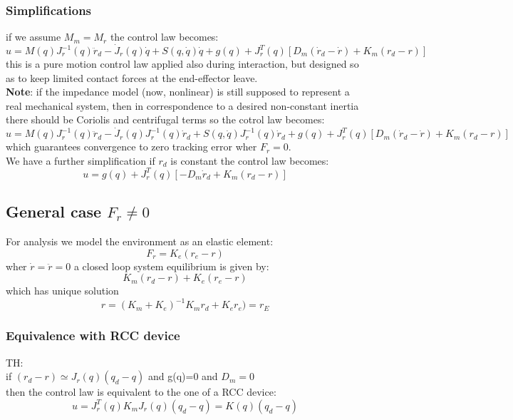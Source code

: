 \documentclass[a4paper,12pt]{article}
\begin{document}
\subsubsection{Simplifications}
if we assume $M_m = M_r$ the control law becomes:
\begin{equation}
u=M(q)J_r^{-1}(q){\ddot{r}_d-\dot{J}_r(q)\dot{q}}+S(q,\dot{q})\dot{q}+g(q)+J_r^T(q)[
    D_m(\dot{r}_d-\dot{r})+K_m(r_d-r)]
\end{equation}
this is a pure motion control law applied also during interaction,
but designed so as to keep limited contact forces
 at the end-effector leave.\\
\textbf{Note}:  if the impedance model (now, nonlinear) is still supposed to
represent a real mechanical system, then in correspondence to a desired
non-constant inertia there should be Coriolis and centrifugal terms so
the cotrol law becomes: \begin{equation}
u=M(q)J_r^{-1}(q){\ddot{r}_d-\dot{J}_r(q)J_r^{-1}(q)\dot{r}_d}+
S(q,\dot{q})J_r^{-1}(q)\dot{r}_d+g(q)+J_r^T(q)[
    D_m(\dot{r}_d-\dot{r})+K_m(r_d-r)]
\end{equation}
which guarantees convergence to zero tracking error wher $F_r=0$.\\
We have a further simplification if $r_d$ is constant the control law becomes:
\begin{equation}
u=g(q)+J_r^T(q)[-D_m\dot{r}_d+K_m(r_d-r)]
\end{equation}
\subsection{General case $F_r \neq 0$}
For analysis we model the environment as an elastic element: 
\begin{equation}
F_r=K_e(r_e-r)
\end{equation}
wher $\dot{r}=\ddot{r}=0$ a closed loop system equilibrium is given by:
\begin{equation}
K_m(r_d-r)+K_e(r_e-r)
\end{equation}
which has unique solution
\begin{equation}
r=(K_m+K_e)^{-1}K_mr_d+K_er_e)=r_E
\end{equation}
\subsubsection{Equivalence with RCC device}
TH:\\
if $(r_d-r) \simeq J_r(q)(q_d-q)$ and g(q)=0 and $D_m=0$\\
then the control law is equivalent to the one of a RCC device:\\
\begin{equation}
    u = J_r^T(q)K_mJ_r(q)(q_d-q)=K(q)(q_d-q)
\end{equation}
\end{document}
